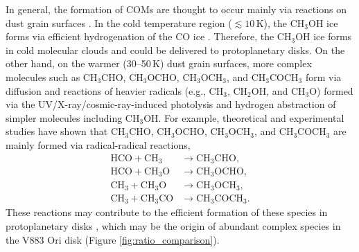 \documentclass[twocolumn, twocolappendix, astrosymb, times]{aastex631}
\newcommand{\methanol}{CH$_3$OH\xspace}
\newcommand{\acetaldehyde}{CH$_3$CHO\xspace}
\newcommand{\methylformate}{CH$_3$OCHO\xspace}
\newcommand{\dimethylether}{CH$_3$OCH$_3$\xspace}
\newcommand{\acetone}{CH$_3$COCH$_3$\xspace}
\begin{document}
In general, the formation of COMs are thought to occur mainly via reactions on dust grain surfaces \citep[][and references therein]{Herbst2009}. In the cold temperature region ($\lesssim 10$\,K), the \methanol ice forms via efficient hydrogenation of the CO ice \citep[e.g.,][]{Tielens1982, Watanabe2002, Watanabe2003}. Therefore, the \methanol ice forms in cold molecular clouds and could be delivered to protoplanetary disks. On the other hand, on the warmer (30--50\,K) dust grain surfaces, more complex molecules such as \acetaldehyde, \methylformate, \dimethylether, and \acetone form via diffusion and reactions of heavier radicals (e.g., CH$_3$, CH$_2$OH, and CH$_3$O) formed via the UV/X-ray/cosmic-ray-induced photolysis and hydrogen abstraction of simpler molecules including \methanol \citep[e.g.,][]{Garrod2006, Garrod2013, Oberg2009, Walsh2014, Furuya2014, Notsu2021, Notsu2022}. For example, theoretical and experimental studies \citep[e.g.,][]{Garrod2006, Chuang2016} have shown that \acetaldehyde, \methylformate, \dimethylether, and \acetone are mainly formed via radical-radical reactions,
\begin{align}
    \mathrm{HCO} + \mathrm{CH_3} &\longrightarrow \mathrm{CH_3CHO}, \label{eq:r-r_reaction1} \\ 
    \mathrm{HCO} + \mathrm{CH_3O} &\longrightarrow \mathrm{CH_3OCHO}, \label{eq:r-r_reaction2} \\
    \mathrm{CH_3} + \mathrm{CH_3O} &\longrightarrow \mathrm{CH_3OCH_3}, \label{eq:r-r_reaction3} \\
    \mathrm{CH_3} + \mathrm{CH_3CO} &\longrightarrow \mathrm{CH_3COCH_3}. \label{eq:r-r_reaction4}
\end{align}
These reactions may contribute to the efficient formation of these species in protoplanetary disks \citep{Walsh2014, Furuya2014}, which may be the origin of abundant complex species in the V883 Ori disk (Figure \ref{fig:ratio_comparison}).


\end{document}
